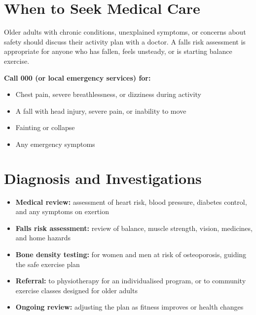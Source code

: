 \section*{When to Seek Medical Care}
Older adults with chronic conditions, unexplained symptoms, or concerns about safety should discuss their activity plan with a doctor. A falls risk assessment is appropriate for anyone who has fallen, feels unsteady, or is starting balance exercise.

\textbf{Call 000 (or local emergency services) for:}
\begin{itemize}
    \item Chest pain, severe breathlessness, or dizziness during activity
    \item A fall with head injury, severe pain, or inability to move
    \item Fainting or collapse
    \item Any emergency symptoms
\end{itemize}

\section*{Diagnosis and Investigations}
\begin{itemize}
    \item \textbf{Medical review:} assessment of heart risk, blood pressure, diabetes control, and any symptoms on exertion
    \item \textbf{Falls risk assessment:} review of balance, muscle strength, vision, medicines, and home hazards
    \item \textbf{Bone density testing:} for women and men at risk of osteoporosis, guiding the safe exercise plan
    \item \textbf{Referral:} to physiotherapy for an individualised program, or to community exercise classes designed for older adults
    \item \textbf{Ongoing review:} adjusting the plan as fitness improves or health changes
\end{itemize}

